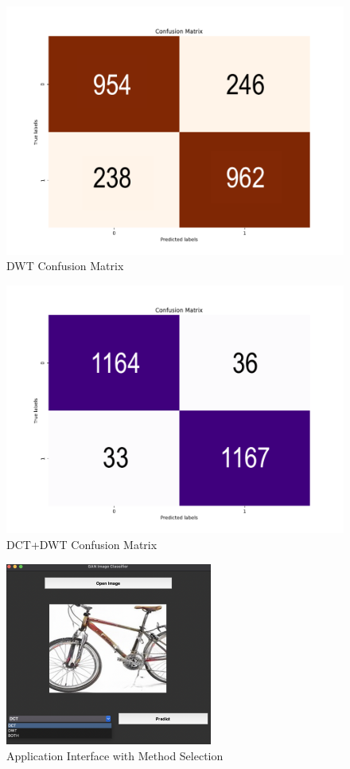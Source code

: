 \documentclass[journal]{./IEEE/IEEEtran}
\begin{document}
\begin{figure}[!ht]
    \centering
    \includegraphics{imgs/DWT_conf_mat.png}
    \caption{DWT Confusion Matrix}
    \label{fig:enter-label}
\end{figure}

\begin{figure}[!ht]
    \centering
    \includegraphics{imgs/BOTH_conf_mat.png}
    \caption{DCT+DWT Confusion Matrix}
    \label{fig:enter-label}
\end{figure}

\begin{figure}[!ht]
    \centering
    \includegraphics[height=6cm]{imgs/app.png}
    \caption{Application Interface with Method Selection}
    \label{fig:enter-label}
\end{figure}
\end{document}

